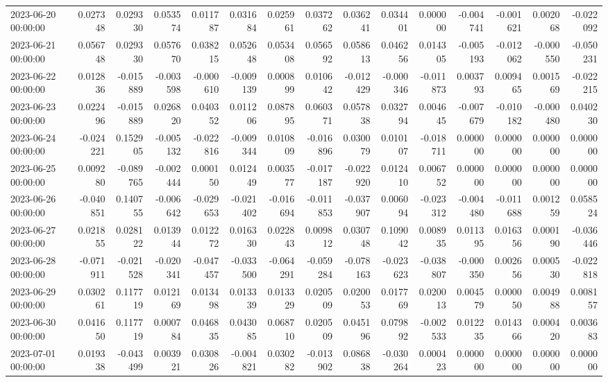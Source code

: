 \begin{tabular}{lrrrrrrrrrrrrrr}
2023-06-20 00:00:00 & 0.027348 & 0.029330 & 0.053574 & 0.011787 & 0.031684 & 0.025961 & 0.037262 & 0.036241 & 0.034401 & 0.000000 & -0.004741 & -0.001621 & 0.002068 & -0.022092 \\
2023-06-21 00:00:00 & 0.056748 & 0.029330 & 0.057670 & 0.038215 & 0.052648 & 0.053408 & 0.056592 & 0.058613 & 0.046256 & 0.014305 & -0.005193 & -0.012062 & -0.000550 & -0.050231 \\
2023-06-22 00:00:00 & 0.012836 & -0.015889 & -0.003598 & -0.000610 & -0.009139 & 0.000899 & 0.010642 & -0.012429 & -0.000346 & -0.011873 & 0.003793 & 0.009465 & 0.001569 & -0.022215 \\
2023-06-23 00:00:00 & 0.022496 & -0.015889 & 0.026820 & 0.040352 & 0.011206 & 0.087895 & 0.060371 & 0.057838 & 0.032794 & 0.004645 & -0.007679 & -0.010182 & -0.000480 & 0.040230 \\
2023-06-24 00:00:00 & -0.024221 & 0.152905 & -0.005132 & -0.022816 & -0.009344 & 0.010809 & -0.016896 & 0.030079 & 0.010107 & -0.018711 & 0.000000 & 0.000000 & 0.000000 & 0.000000 \\
2023-06-25 00:00:00 & 0.009280 & -0.089765 & -0.002444 & 0.000150 & 0.012449 & 0.003577 & -0.017187 & -0.022920 & 0.012410 & 0.006752 & 0.000000 & 0.000000 & 0.000000 & 0.000000 \\
2023-06-26 00:00:00 & -0.040851 & 0.140755 & -0.006642 & -0.029653 & -0.021402 & -0.016694 & -0.011853 & -0.037907 & 0.006094 & -0.023312 & -0.004480 & -0.011688 & 0.001259 & 0.058524 \\
2023-06-27 00:00:00 & 0.021855 & 0.028122 & 0.013944 & 0.012272 & 0.016330 & 0.022843 & 0.009812 & 0.030748 & 0.109042 & 0.008935 & 0.011395 & 0.016356 & 0.000190 & -0.036446 \\
2023-06-28 00:00:00 & -0.071911 & -0.021528 & -0.020341 & -0.047457 & -0.033500 & -0.064291 & -0.059284 & -0.078163 & -0.023623 & -0.038807 & -0.000350 & 0.002656 & 0.000530 & -0.022818 \\
2023-06-29 00:00:00 & 0.030261 & 0.117719 & 0.012169 & 0.013498 & 0.013339 & 0.013329 & 0.020509 & 0.020053 & 0.017769 & 0.020013 & 0.004579 & 0.000050 & 0.004988 & 0.008157 \\
2023-06-30 00:00:00 & 0.041650 & 0.117719 & 0.000784 & 0.046835 & 0.043085 & 0.068710 & 0.020509 & 0.045196 & 0.079892 & -0.002533 & 0.012235 & 0.014366 & 0.000420 & 0.003683 \\
2023-07-01 00:00:00 & 0.019338 & -0.043499 & 0.003921 & 0.030826 & -0.004821 & 0.030282 & -0.013902 & 0.086838 & -0.030264 & 0.000423 & 0.000000 & 0.000000 & 0.000000 & 0.000000 \\

\end{tabular}
